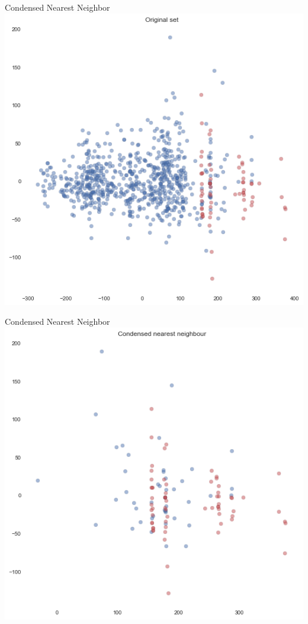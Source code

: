 \documentclass[10pt]{beamer}
\begin{document}
\begin{frame}{Condensed Nearest Neighbor}
  \centering
  \includegraphics[width=\textwidth, height=0.8 \textheight, keepaspectratio]{images/cnn-original}
\end{frame}

\begin{frame}{Condensed Nearest Neighbor}
  \centering
  \includegraphics[width=\textwidth, height=0.8 \textheight, keepaspectratio]{images/cnn}
\end{frame}
\end{document}
